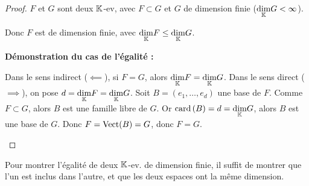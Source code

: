 \documentclass[12pt, a4paper]{report}
\begin{document}
\begin{proof}
    $F$ et $G$ sont deux $\mathbb{K}$-ev, avec $F \subset G$ et $G$ de dimension finie ($\underset{\mathbb{K}}\dim G < \infty$).

    Donc $F$ est de dimension finie, avec $\underset{\mathbb{K}}\dim F \le \underset{\mathbb{K}}\dim G$.

    \textbf{Démonstration du cas de l'égalité :}
    \begin{outline}
        \1 Dans le sens indirect ($\impliedby$), si $F = G$, alors $\underset{\mathbb{K}}\dim F = \underset{\mathbb{K}}\dim G$.
        \1 Dans le sens direct ($\implies$), on pose $d = \underset{\mathbb{K}}\dim F = \underset{\mathbb{K}}\dim G$.
        \2 Soit $B = (e_1,\dots,e_d)$ une base de $F$.
        \2 Comme $F \subset G$, alors $B$ est une famille libre de $G$.
        \2 Or $\mathrm{card}\left(B\right) = d = \underset{\mathbb{K}}\dim G$, alors $B$ est une base de $G$.
        \2 Donc $F = \mathrm{Vect}(B) = G$, donc $F = G$.
    \end{outline}
\end{proof}

\begin{methodbox}
    Pour montrer l'égalité de deux $\mathbb{K}$-ev. de dimension finie, il suffit de montrer que l'un est inclus dans l'autre, et que les deux espaces ont la même dimension.
\end{methodbox}
\end{document}
